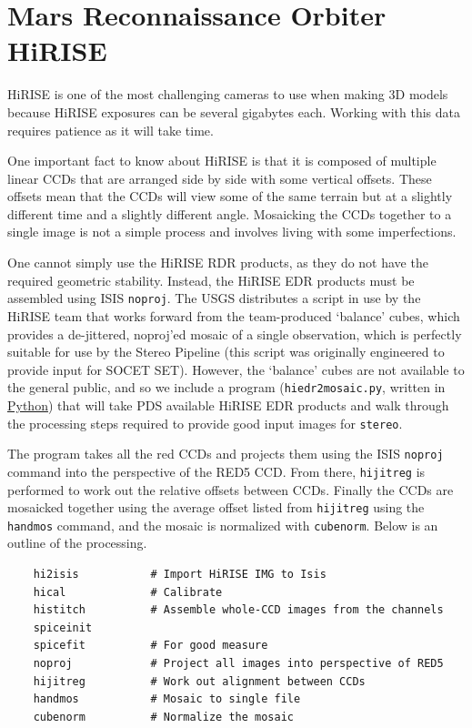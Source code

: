 \section{Mars Reconnaissance Orbiter HiRISE}

\ac{HiRISE} is one of the most challenging cameras to use when making 3D
models because \ac{HiRISE} exposures can be several gigabytes each. Working
with this data requires patience as it will take time.

One important fact to know about HiRISE is that it is composed of
multiple linear CCDs that are arranged side by side with some vertical
offsets. These offsets mean that the CCDs will view some of the same
terrain but at a slightly different time and a slightly different
angle. Mosaicking the CCDs together to a single image is not a simple
process and involves living with some imperfections.

One cannot simply use the \ac{HiRISE} RDR products, as they do not
have the required geometric stability.  Instead, the \ac{HiRISE}
EDR products must be assembled using \ac{ISIS} \texttt{noproj}.
The USGS distributes a script in use by the \ac{HiRISE} team that
works forward from the team-produced `balance' cubes, which provides
a de-jittered, noproj'ed mosaic of a single observation, which is
perfectly suitable for use by the Stereo Pipeline (this script was
originally engineered to provide input for SOCET SET).  However,
the `balance' cubes are not available to the general public, and
so we include a program (\texttt{hiedr2mosaic.py}, written in
\href{http://www.python.org}{Python}) that will take \ac{PDS}
available \ac{HiRISE} EDR products and walk through the processing
steps required to provide good input images for \texttt{stereo}.

The program takes all the red CCDs and projects them using the \ac{ISIS}
{\tt noproj} command into the perspective of the RED5 CCD. From there,
{\tt hijitreg} is performed to work out the relative offsets between
CCDs. Finally the CCDs are mosaicked together using the average
offset listed from {\tt hijitreg} using the {\tt handmos} command,
and the mosaic is normalized with {\tt cubenorm}.
Below is an outline of the processing.

\begin{verbatim}
    hi2isis           # Import HiRISE IMG to Isis
    hical             # Calibrate
    histitch          # Assemble whole-CCD images from the channels
    spiceinit
    spicefit          # For good measure
    noproj            # Project all images into perspective of RED5
    hijitreg          # Work out alignment between CCDs
    handmos           # Mosaic to single file
    cubenorm          # Normalize the mosaic
\end{verbatim}

